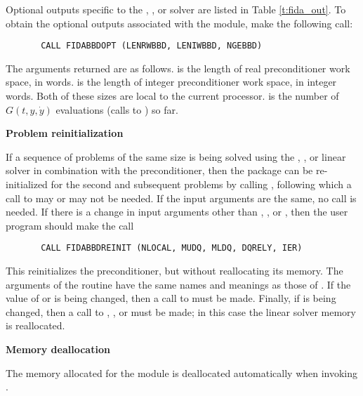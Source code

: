 \begin{Steps}
  Optional outputs specific to the {\spgmr}, {\spbcg}, or {\sptfqmr} solver are 
  listed in Table \ref{t:fida_out}.
  To obtain the optional outputs associated with the {\idabbdpre}
  module, make the following call:
\begin{verbatim}
       CALL FIDABBDOPT (LENRWBBD, LENIWBBD, NGEBBD)
\end{verbatim}
  The arguments returned are as follows.
   is the length of real preconditioner work space, in 
  words.   is the length of integer preconditioner work space, in
  integer words.  Both of these sizes are local to the current processor.
   is the number of $G(t,y,\dot{y})$ evaluations (calls to )
  so far.
  
\item {\bf Problem reinitialization}
  
  If a sequence of problems of the same size is being solved using the {\spgmr},
  {\spbcg}, or {\sptfqmr} linear solver in combination with the {\idabbdpre}
  preconditioner, then the {\ida} package can be re-initialized for the second
  and subsequent problems by calling , following which a call
  to  may or  may not be needed.
  If the input arguments are the same, no  call is needed.
  If there is a change in input arguments other than , , or
  , then the user program should make the call 
\begin{verbatim}
       CALL FIDABBDREINIT (NLOCAL, MUDQ, MLDQ, DQRELY, IER)
\end{verbatim}
  This reinitializes the {\idabbdpre} preconditioner, but without
  reallocating its memory.  The arguments of the 
  routine have the same names and meanings as those of .
  If the value of  or  is being changed, then a call to
   must be made.  Finally, if  is being  changed,
  then a call to , , or 
  must be made; in this case the linear solver memory is reallocated.

\item {\bf Memory deallocation}

  The memory allocated for the {\fidabbd} module is deallocated automatically
  when invoking .



\end{Steps}
